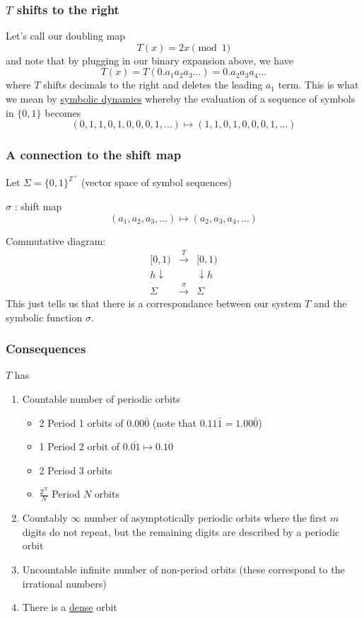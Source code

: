 \documentclass{article}
\begin{document}
\subsubsection{$T$ shifts to the right}

Let's call our doubling map 
\[
T(x) = 2x \pmod 1
\]
and note that by plugging in our binary expansion above, we have 
\[
T\left(x \right) = T\left(0.a_1a_2a_3\ldots\right)=0.a_2a_3a_4\ldots
\]
where $T$ shifts decimals to the right and deletes the leading $a_1$ term. This is what we mean by \underline{symbolic dynamics} whereby the evaluation of a sequence of symbols in $\{0,1\}$ becomes 
\[
\left(0,1,1,0,1,0,0,0,1,\ldots\right) \mapsto \left(1,1,0,1,0,0,0,1,\ldots\right)
\]

\subsubsection{A connection to the shift map}

Let $\Sigma = \{0, 1\}^{\mathbb{Z}^+}$ \quad (vector space of symbol sequences)

\medskip
\noindent $\sigma$ : shift map
\[
(a_1, a_2, a_3, \ldots) \mapsto (a_2, a_3, a_4, \ldots)
\]

\noindent Commutative diagram:
\[
\begin{array}{ccc}
[0, 1) & \xrightarrow{T} & [0, 1) \\
h \downarrow & & \downarrow h \\
\Sigma & \xrightarrow{\sigma} & \Sigma
\end{array}
\]
This just tells us that there is a correspondance between our system $T$ and the symbolic function $\sigma$. 

\subsubsection{Consequences}

$T$ has 
\begin{enumerate}
    \item Countable number of periodic orbits 
    \begin{itemize}
        \item 2 Period 1 orbits of $0.00\bar{0}$ (note that $0.11\bar{1}=1.00\bar{0}$)
        \item 1 Period 2 orbit of $0.\overline{01}\mapsto 0.\overline{10}$
        \item 2 Period 3 orbits
        \item $\frac{2^N}{N}$ Period $N$ orbits 
    \end{itemize}
    \item Countably $\infty$ number of asymptotically periodic orbits where the first $m$ digits do not repeat, but the remaining digits are described by a periodic orbit 
    \item Uncountable infinite number of non-period orbits (these correspond to the irrational numbers)
    \item There is a \underline{dense} orbit 
\end{enumerate}
\end{document}
